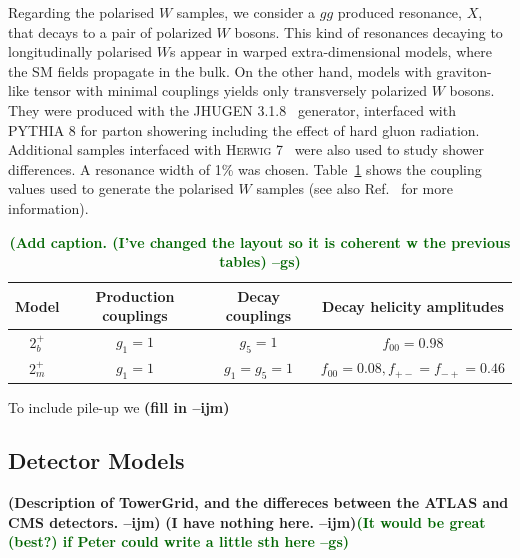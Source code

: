 \documentclass[11pt,letterpaper]{article}
\newcommand{\ijm}[1]{\textbf{\textcolor{llblue}{(#1 --ijm)}}}
\newcommand{\gs}[1]{\textbf{\textcolor{darkgreen}{(#1 --gs)}}}
\begin{document}
Regarding the polarised $W$ samples, we consider a $gg$ produced resonance, $X$, that decays to a pair of polarized $W$ bosons. This kind of resonances decaying to longitudinally polarised $W$s appear in warped extra-dimensional models, where the SM fields propagate in the bulk. On the other hand, models with graviton-like tensor with minimal couplings yields only transversely polarized $W$ bosons. They were produced with the \textsc{JHUGEN} 3.1.8~\cite{Gao:2010qx,Bolognesi:2012mm} generator, interfaced with \textsc{PYTHIA} 8 \cite{Sjostrand:2007gs} for parton showering including the effect of hard gluon radiation. Additional samples interfaced with \textsc{Herwig} 7~\cite{Bahr:2008pv,Bellm:2015jjp} were also used to study shower differences. A resonance width of 1\% was chosen. Table~\ref{table:polarisedSamples} shows the coupling values used to generate the polarised $W$ samples (see also Ref.~\cite{Gao:2010qx} for more information). 

\begin{table}[ht]
\centering
\begin{tabular}{|c|c|c|c|}
\hline
Model	&Production couplings	&Decay couplings	&Decay helicity amplitudes 	\\
\hline
$2_b^+$	& $g_1=1$		& $g_5=1$		& $f_{00}=0.98$			\\
$2_m^+$	& $g_1=1$		& $g_1=g_5=1$		& $f_{00}=0.08,f_{+-}=f_{-+}=0.46$\\	
\hline
\end{tabular}
\caption{\gs{Add caption. (I've changed the layout so it is coherent w
  the previous tables)}}
\label{table:polarisedSamples}
\end{table}

To include pile-up we \ijm{fill in}


\subsection{Detector Models}\label{sec:det_model}

\ijm{Description of TowerGrid, and the differeces between the ATLAS and CMS detectors. }
\ijm{I have nothing here.}\gs{It would be great (best?) if Peter could
  write a little sth here} 
\end{document}
